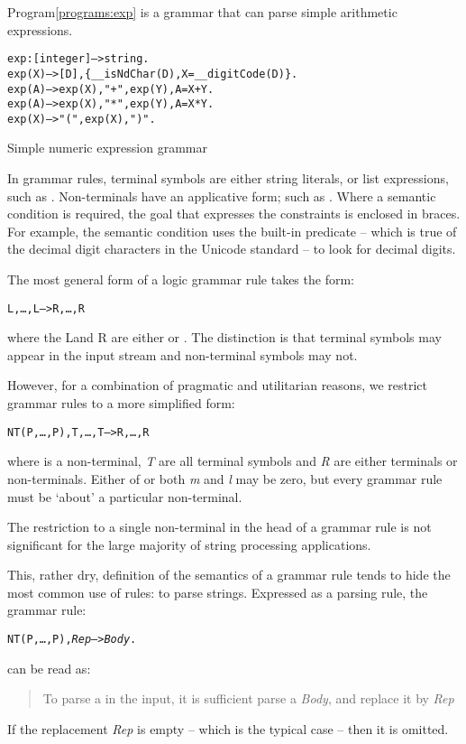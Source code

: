 Program\vref{programs:exp} is a grammar that can parse simple arithmetic expressions.
\begin{program}
\vspace{0.5ex}
\begin{alltt}
exp:[integer]-->string.
exp(X) --> [D], \{ __isNdChar(D), X=__digitCode(D) \}.
exp(A) --> exp(X), "+", exp(Y), A=X+Y.
exp(A) --> exp(X), "*", exp(Y), A=X*Y.
exp(X) --> "(",exp(X),")".
\end{alltt}
\vspace{-2ex}
\caption{Simple numeric expression grammar}
\label{programs:exp}
\end{program}
In grammar rules, ter\-mi\-nal symbols are either string literals, or list expressions, such as \q{[D]}. Non-terminals have an applicative form; such as . Where a semantic condition is required, the goal that expresses the constraints is enclosed in braces. For example, the semantic condition  uses the built-in predicate  -- which is true of the decimal digit characters in the Unicode standard -- to look for decimal digits.

The most general form of a logic grammar rule takes the form:
\begin{alltt}
L,\ldots,L\subn --> R,\ldots,R
\end{alltt}
where the L\subi and R are either  or . The distinction is that terminal symbols may appear in the input stream and non-terminal symbols may not.

However, for a combination of pragmatic and utilitarian reasons, we restrict \go grammar rules to a more simplified form:
\begin{alltt}
NT(P,\ldots,P\subn),T,\ldots,T --> R,\ldots,R
\end{alltt}
where  is a non-terminal, \emph{T\subi} are all terminal symbols and \emph{R} are either terminals or non-terminals. Either of or both \emph{m} and \emph{l} may be zero, but every grammar rule must be `about' a particular non-terminal.

The restriction to a single non-terminal in the head of a grammar rule is not significant for the large majority of string processing applications.

This, rather dry, definition of the semantics of a grammar rule tends to hide the most common use of rules: to parse strings. Expressed as a parsing rule, the grammar rule:
\begin{alltt}
NT(P,\ldots,P\subn),\emph{Rep} --> \emph{Body}.
\end{alltt}
 can be read as:
\begin{quote}
To parse a  in the input, it is sufficient parse a \emph{Body}, and replace it by \emph{Rep}
\end{quote}
If the replacement \emph{Rep} is empty -- which is the typical case -- then it is omitted.

